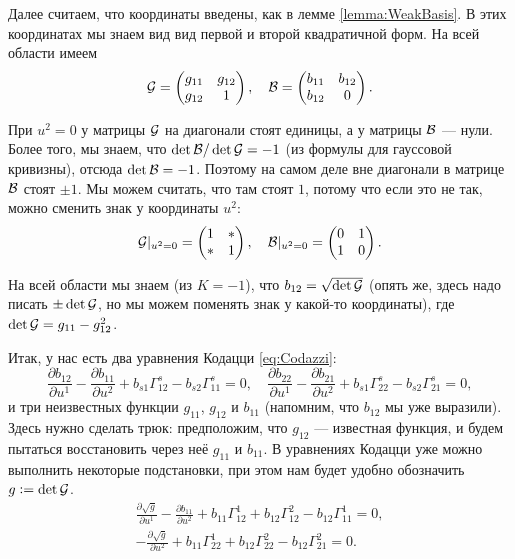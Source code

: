 Далее считаем, что координаты введены, как в лемме \ref{lemma:WeakBasis}. В этих координатах мы знаем вид вид первой и второй квадратичной форм. На всей области имеем
\[
	\mathcal{G} =
	\begin{pmatrix}
		g_{11} & g_{12}\\
		g_{12} & 1
	\end{pmatrix},\quad
	\mathcal{B} =
	\begin{pmatrix}
		b_{11} & b_{12}\\
		b_{12} & 0
	\end{pmatrix}.
\]

При $u^2 = 0$ у матрицы $\mathcal{G}$ на диагонали стоят единицы, а у матрицы $\mathcal{B}$ --- нули. Более того, мы знаем, что $\det\mathcal{B} / \det\mathcal{G} = -1$ (из формулы для гауссовой кривизны), отсюда $\det\mathcal{B} = -1$. Поэтому на самом деле вне диагонали в матрице $\mathcal{B}$ стоят $\pm 1$. Мы можем считать, что там стоят $1$, потому что если это не так, можно сменить знак у координаты $u^2$:
\begin{equation} \label{eq:GBu20}
	\mathcal{G}|_{u^2 = 0} =
	\begin{pmatrix}
		1 & \ast\\
		\ast & 1
	\end{pmatrix},\quad
	\mathcal{B}|_{u^2 = 0} =
	\begin{pmatrix}
		0 & 1\\
		1 & 0
	\end{pmatrix}.
\end{equation}

На всей области мы знаем (из $K = -1$), что $b_{12} = \sqrt{\det\mathcal{G}}$ (опять же, здесь надо писать $\pm\det\mathcal{G}$, но мы можем поменять знак у какой-то координаты), где $\det\mathcal{G} = g_{11} - g_{12}^2$.

Итак, у нас есть два уравнения Кодацци \eqref{eq:Codazzi}:
\[
	\frac{\partial b_{12}}{\partial u^1} - \frac{\partial b_{11}}{\partial u^2} + b_{s1}\Gamma_{12}^s - b_{s2}\Gamma_{11}^s = 0,\quad
	\frac{\partial b_{22}}{\partial u^1} - \frac{\partial b_{21}}{\partial u^2} + b_{s1}\Gamma_{22}^s - b_{s2}\Gamma_{21}^s = 0,
\]
и три неизвестных функции $g_{11}$, $g_{12}$ и $b_{11}$ (напомним, что $b_{12}$ мы уже выразили). Здесь нужно сделать трюк: предположим, что $g_{12}$ --- известная функция, и будем пытаться восстановить через неё $g_{11}$ и $b_{11}$. В уравнениях Кодацци уже можно выполнить некоторые подстановки, при этом нам будет удобно\footnotemark{} обозначить $g \vcentcolon = \det\mathcal{G}$.
\begin{gather*}
	\frac{\partial\sqrt{g}}{\partial u^1} - \frac{\partial b_{11}}{\partial u^2} + b_{11}\Gamma_{12}^1 + b_{12}\Gamma_{12}^2 - b_{12}\Gamma_{11}^1 = 0,\\
	-\frac{\partial\sqrt{g}}{\partial u^2} + b_{11}\Gamma_{22}^1 + b_{12}\Gamma_{22}^2 - b_{12}\Gamma_{21}^2 = 0.
\end{gather*}

